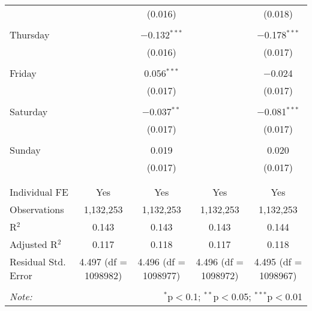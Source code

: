\documentclass[
]{article}
\begin{document}
\begin{table}[!htbp]
{\begin{tabular}{@{\extracolsep{5pt}}lcccc}
  &  & (0.016) &  & (0.018) \\ 
  & & & & \\ 
 Thursday &  & $-$0.132$^{***}$ &  & $-$0.178$^{***}$ \\ 
  &  & (0.016) &  & (0.017) \\ 
  & & & & \\ 
 Friday &  & 0.056$^{***}$ &  & $-$0.024 \\ 
  &  & (0.017) &  & (0.017) \\ 
  & & & & \\ 
 Saturday &  & $-$0.037$^{**}$ &  & $-$0.081$^{***}$ \\ 
  &  & (0.017) &  & (0.017) \\ 
  & & & & \\ 
 Sunday &  & 0.019 &  & 0.020 \\ 
  &  & (0.017) &  & (0.017) \\ 
  & & & & \\ 
\hline \\[-1.8ex] 
Individual FE & Yes & Yes & Yes & Yes \\ 
Observations & 1,132,253 & 1,132,253 & 1,132,253 & 1,132,253 \\ 
R$^{2}$ & 0.143 & 0.143 & 0.143 & 0.144 \\ 
Adjusted R$^{2}$ & 0.117 & 0.118 & 0.117 & 0.118 \\ 
Residual Std. Error & 4.497 (df = 1098982) & 4.496 (df = 1098977) & 4.496 (df = 1098972) & 4.495 (df = 1098967) \\ 
\hline 
\hline \\[-1.8ex] 
\textit{Note:}  & \multicolumn{4}{r}{$^{*}$p$<$0.1; $^{**}$p$<$0.05; $^{***}$p$<$0.01} \\ 
\end{tabular}
} 
\end{table}
\end{document}

